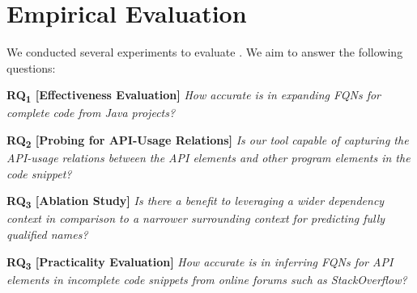 \section{Empirical Evaluation}
\label{sec:eval}


We conducted several experiments to evaluate {\tool}. We aim to answer the following questions:

\vspace{2pt}
\noindent \textbf{RQ\textsubscript{1} 
  [Effectiveness Evaluation]} {\em How accurate is {\tool} in expanding FQNs for complete code from Java projects?}

\vspace{2pt}
\noindent \textbf{RQ\textsubscript{2} [Probing for API-Usage Relations]} {\em Is our tool capable of capturing the API-usage relations between the API elements and other program elements in the code snippet?}

\vspace{2pt}
\noindent \textbf{RQ\textsubscript{3} 
[Ablation Study]}  {\em Is there a benefit to leveraging a wider dependency context in comparison to a narrower surrounding context for predicting fully qualified names?}

\vspace{2pt}
\noindent \textbf{RQ\textsubscript{3} 
[Practicality Evaluation]}  {\em How accurate is {\tool} in 
inferring FQNs for API elements in incomplete code snippets from online forums such as StackOverflow?}

%
